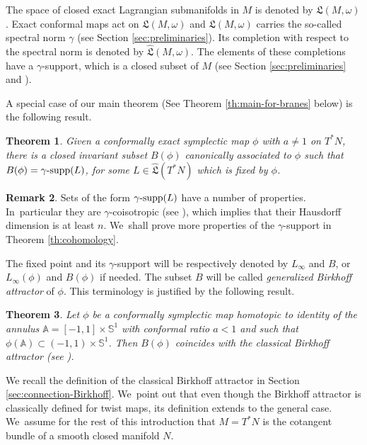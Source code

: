 \documentclass[10pt]{amsart}
\newtheorem{thm}{Theorem}[section]
\theoremstyle{definition}
\newtheorem{rem}[thm]{Remark}
\newcommand{\bS}{\mathbb{S}}
\DeclareMathOperator{\gammasupp}{\gamma\textup{-supp}}
\newcommand{\fL}{\mathfrak {L}}
\newcommand{\hatL}{\widehat{\fL}}
\begin{document}
The space of closed exact Lagrangian submanifolds in $M$ is denoted by $\fL(M,\omega)$.
Exact conformal maps act on $\fL(M,\omega)$ and $\fL(M,\omega)$ carries the so-called spectral norm $\gamma$ (see Section \ref{sec:preliminaries}). Its completion with respect to the spectral norm is denoted by $\hatL(M,\omega)$. The elements of these completions have a $\gamma$\nobreakdash-support, which is a closed subset of $M$ (see Section \ref{sec:preliminaries} and \cite{Viterbo-gammas}).

A special case of our main theorem (See Theorem \ref{th:main-for-branes} below) is the following result.

\begin{thm}\label{th:main}
Given a conformally exact symplectic map $\phi$ with $a\neq 1$ on $T^*N$, there is a closed invariant subset $B(\phi)$ canonically associated to $\phi$ such that $B(\phi)=\gammasupp(L)$, for some $L \in \hatL(T^*N)$ which is fixed by $\phi$.
\end{thm}

\begin{rem}
Sets of the form $\gammasupp(L)$ have a number of properties. In~particular they are $\gamma$\nobreakdash-coisotropic (see \cite{Viterbo-gammas}), which implies that their Hausdorff dimension is at least $n$. We~shall prove more properties of the $\gamma$\nobreakdash-support in Theorem \ref{th:cohomology}.
\end{rem}

The fixed point and its $\gamma$\nobreakdash-support will be respectively denoted by $L_\infty$ and $B$, or~$L_\infty(\phi)$ and $B(\phi)$ if needed.
The subset $B$ will be called \emph{generalized Birkhoff attractor} of $\phi$. This terminology is justified by the following result.

\begin{thm}\label{th:annulus-case}
Let $\phi$ be a conformally symplectic map homotopic to identity of the annulus $\mathbb{A}=[-1,1]\times \bS^1$ with conformal ratio $a<1$ and such that $\phi(\mathbb{A})\subset (-1,1)\times\bS^1$. Then $B(\phi)$ coincides with the classical Birkhoff attractor (see \cite{Birkhoff-attractor}).
\end{thm}

We recall the definition of the classical Birkhoff attractor in Section \ref{sec:connection-Birkhoff}. We~point out that even though the Birkhoff attractor is classically defined for twist maps, its definition extends to the general case. We~assume for the rest of this introduction that $M=T^*N$ is the cotangent bundle of a smooth closed manifold $N$.
\end{document}
